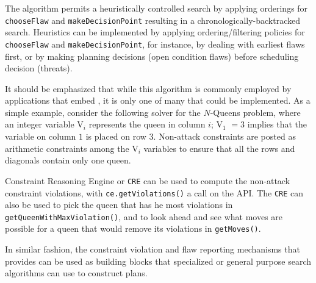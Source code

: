 The algorithm permits a heuristically controlled search by
applying orderings for \texttt{chooseFlaw} and
\texttt{makeDecisionPoint} resulting in a chronologically-backtracked
search. Heuristics can be implemented by applying ordering/filtering
policies for \texttt{chooseFlaw} and \texttt{makeDecisionPoint}, for
instance, by dealing with earliest flaws first, or by making planning
decisions (open condition flaws) before scheduling decision (threats).

It should be emphasized that while this algorithm is commonly employed
by applications that embed  \eu, it is only one of many that could be
implemented. As a simple example, consider the following solver for
the $N$-Queens problem, where an integer variable V$_i$ represents the
queen in column $i$; V$_1$ $= 3$ implies that the variable on column
$1$ is placed on row $3$.  Non-attack constraints are posted as
arithmetic constraints among the V$_i$ variables to ensure that all
the rows and diagonals contain only one queen. 

\begin{algorithm}[H]
  \caption{$solveNQueens(ce, maxIter)$}
\end{algorithm}

\eus Constraint Reasoning Engine or \texttt{CRE} can be used to compute the
non-attack constraint violations, with \texttt{ce.getViolations()} a
call on the \eu API. The \texttt{CRE} can also be used to pick the queen 
that has he most violations in \texttt{getQueenWithMaxViolation()}, and to
look ahead and see what moves are possible for a queen that would remove its
violations in \texttt{getMoves()}. 

In similar fashion, the constraint violation and flaw reporting
mechanisms that \eu provides can be used as building blocks that
specialized or general purpose search algorithms can use to construct
plans.




 